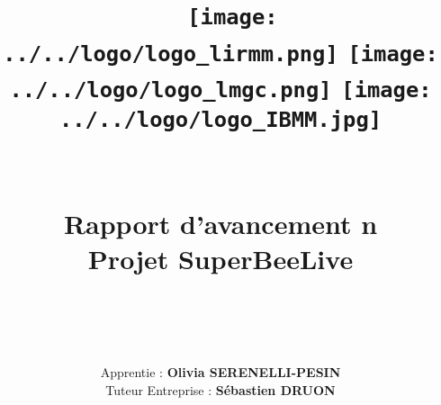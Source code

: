 \documentclass[11pt,french,a4paper]{report}
\begin{document}
\title{ 
    \texttt{[image: ../../logo/logo\_lirmm.png]}  
    \texttt{[image: ../../logo/logo\_lmgc.png]}
    \texttt{[image: ../../logo/logo\_IBMM.jpg]}
    \hfill \\
    \hrulefill \\
    \hfill \\
    \LARGE \textbf{{Rapport d'avancement n\\ Projet SuperBeeLive}} \\
    \hrulefill \\
    \hfill \\
    }
\author{
    \large{Apprentie : \textbf{Olivia SERENELLI-PESIN}} \\
    \large{Tuteur Entreprise : \textbf{Sébastien DRUON}}
    \date{}
    }
\maketitle
\clearpage
\newpage

\tableofcontents
\end{document}
